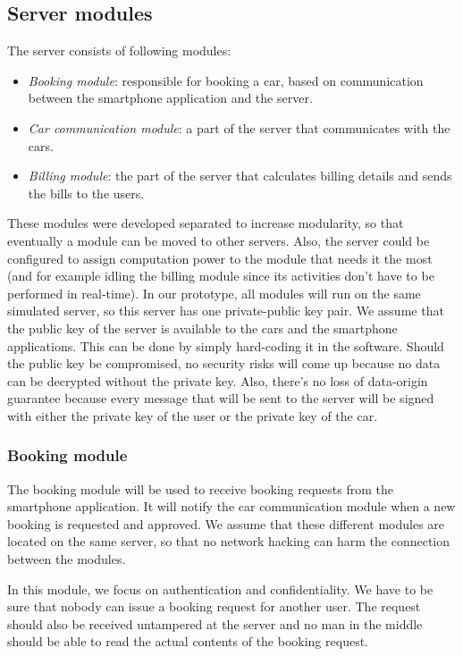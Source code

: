 \documentclass[12pt,a4paper, oneside]{article}
\begin{document}
\subsection{Server modules}\label{sec:server-modules}
The server consists of following modules:
\begin{itemize}
\item \textit{Booking module}: responsible for booking a car, based on communication between the smartphone application and the server.
\item \textit{Car communication module}: a part of the server that communicates with the cars.
\item \textit{Billing module}: the part of the server that calculates billing details and sends the bills to the users.
\end{itemize}
These modules were developed separated to increase modularity, so that eventually a module can be moved to other servers. Also, the server could be configured to assign computation power to the module that needs it the most (and for example idling the billing module since its activities don't have to be performed in real-time). In our prototype, all modules will run on the same simulated server, so this server has one private-public key pair. We assume that the public key of the server is available to the cars and the smartphone applications. This can be done by simply hard-coding it in the software. Should the public key be compromised, no security risks will come up because no data can be decrypted without the private key. Also, there's no loss of data-origin guarantee because every message that will be sent to the server will be signed with either the private key of the user or the private key of the car.

\subsubsection{Booking module}\label{sec:booking-module}
The booking module will be used to receive booking requests from the smartphone application. It will notify the car communication module when a new booking is requested and approved.  We assume that these different modules are located on the same server, so that no network hacking can harm the connection between the modules.
\par
In this module, we focus on authentication and confidentiality. We have to be sure that nobody can issue a booking request for another user. The request should also be received untampered at the server and no man in the middle should be able to read the actual contents of the booking request.
\end{document}
